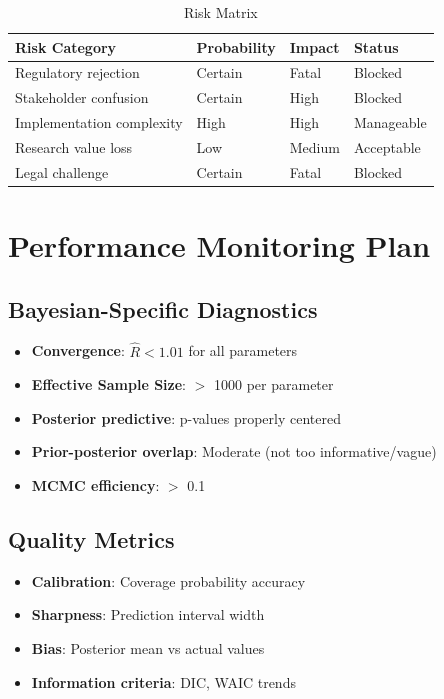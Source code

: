 \begin{table}[h]
\centering
\caption{Risk Matrix}
\begin{tabular}{llll}
\toprule
\textbf{Risk Category} & \textbf{Probability} & \textbf{Impact} & \textbf{Status} \\
\midrule
Regulatory rejection & Certain & Fatal & Blocked \\
Stakeholder confusion & Certain & High & Blocked \\
Implementation complexity & High & High & Manageable \\
Research value loss & Low & Medium & Acceptable \\
Legal challenge & Certain & Fatal & Blocked \\
\bottomrule
\end{tabular}
\end{table}

\section{Performance Monitoring Plan}

\subsection{Bayesian-Specific Diagnostics}

\begin{itemize}
    \item \textbf{Convergence}: $\hat{R} < 1.01$ for all parameters
    \item \textbf{Effective Sample Size}: $>$ 1000 per parameter
    \item \textbf{Posterior predictive}: p-values properly centered
    \item \textbf{Prior-posterior overlap}: Moderate (not too informative/vague)
    \item \textbf{MCMC efficiency}: $>$ 0.1
\end{itemize}

\subsection{Quality Metrics}

\begin{itemize}
    \item \textbf{Calibration}: Coverage probability accuracy
    \item \textbf{Sharpness}: Prediction interval width
    \item \textbf{Bias}: Posterior mean vs actual values
    \item \textbf{Information criteria}: DIC, WAIC trends
\end{itemize}

